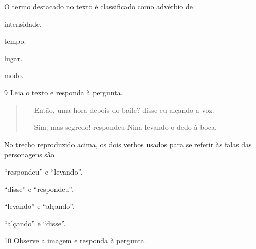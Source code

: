 O termo destacado no texto é classificado como advérbio de

\begin{escolha}
  \item intensidade.

  \item tempo.

  \item lugar.

  \item modo.
\end{escolha}



\num{9} Leia o texto e responda à pergunta.

\begin{quote}
--- Então, uma hora depois do baile? disse eu alçando a voz.

--- Sim; mas segredo! respondeu Nina levando o dedo à boca.
\end{quote}


No trecho reproduzido acima, os dois verbos usados para se referir às
falas das personagens são

\begin{escolha}
  \item ``respondeu'' e ``levando''.

  \item ``disse'' e ``respondeu''.

  \item ``levando'' e ``alçando''.

  \item ``alçando'' e ``disse''.
\end{escolha}



\num{10} Observe a imagem e responda à pergunta.
 
